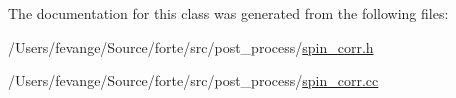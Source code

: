 The documentation for this class was generated from the following files\+:\begin{DoxyCompactItemize}
\item 
/\+Users/fevange/\+Source/forte/src/post\+\_\+process/\mbox{\hyperlink{spin__corr_8h}{spin\+\_\+corr.\+h}}\item 
/\+Users/fevange/\+Source/forte/src/post\+\_\+process/\mbox{\hyperlink{spin__corr_8cc}{spin\+\_\+corr.\+cc}}\end{DoxyCompactItemize}
